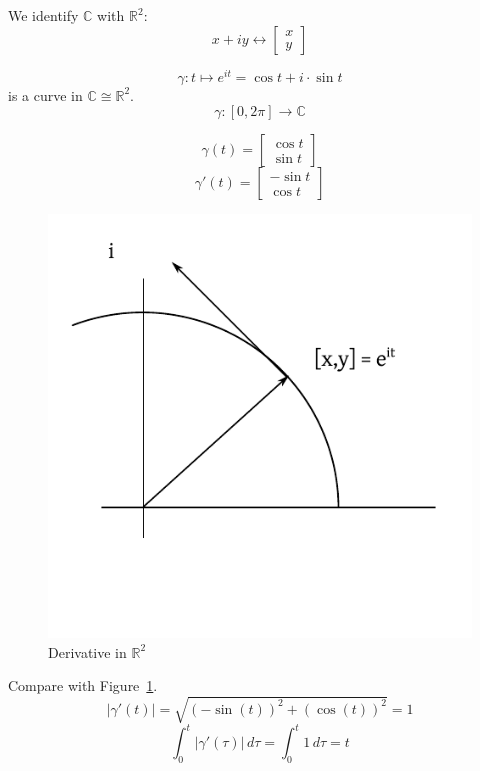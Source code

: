 \documentclass[a4paper,landscape,twocolumn]{article}
\theoremstyle{definition}
\newcommand\abs[1]{\left|#1\right|}
\begin{document}
We identify $\mathbb C$ with $\mathbb R^2$:
\[ x + iy \leftrightarrow \begin{bmatrix} x \\ y \end{bmatrix} \]

\[ \gamma: t \mapsto e^{it} = \cos{t} + i \cdot \sin{t} \]
is a curve in $\mathbb C \cong \mathbb R^2$.
\[ \gamma: [0,2\pi] \to \mathbb C \]

\[ \gamma(t) = \begin{bmatrix} \cos{t} \\ \sin{t} \end{bmatrix} \]
\[ \gamma'(t) = \begin{bmatrix} -\sin{t} \\ \cos{t} \end{bmatrix} \]

\begin{figure}[!h]
  \begin{center}
    \includegraphics{img/derivative-in-r2.pdf}
    \caption{Derivative in $\mathbb R^2$}
    \label{img:deriv-r2}
  \end{center}
\end{figure}

Compare with Figure~\ref{img:deriv-r2}.
\[ \abs{\gamma'(t)} = \sqrt{(-\sin(t))^2 + (\cos(t))^2} = 1 \]
\[ \int_0^t \abs{\gamma'(\tau)} \, d\tau = \int_0^t 1 \, d\tau = t \]
\end{document}
